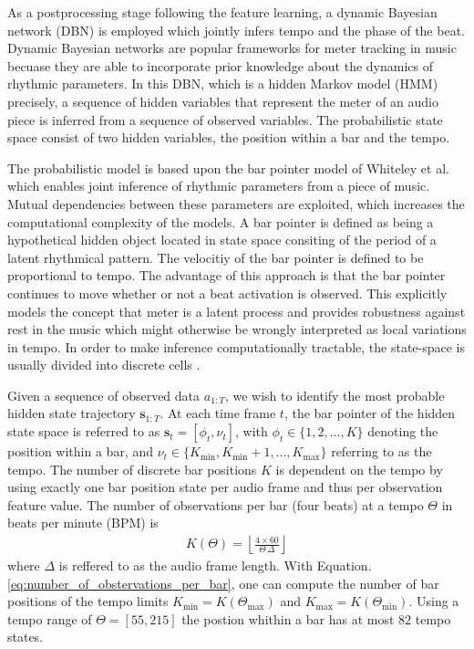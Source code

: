 \documentclass{scrartcl}
\begin{document}
As a postprocessing stage following the feature learning, a dynamic Bayesian network (DBN) is employed which jointly infers tempo and the phase of the beat. Dynamic Bayesian networks are popular frameworks for meter tracking in music becuase they are able to incorporate prior knowledge about the dynamics of rhythmic parameters. 
In this DBN, which is a hidden Markov model (HMM) precisely, a sequence of hidden variables that represent the meter of an audio piece is inferred from a sequence of observed variables. The probabilistic state space consist of two hidden variables, the position within a bar and the tempo. 

The probabilistic model is based upon the bar pointer model of Whiteley et al. \cite{Whiteley2006} which enables joint inference of rhythmic parameters from a piece of music. Mutual dependencies between these parameters are exploited, which increases the computational complexity of the models. A bar pointer is defined as being a hypothetical hidden object located in state space consiting of the period of a latent rhythmical pattern. The velocitiy of the bar pointer is defined to be proportional to tempo. The advantage of this approach is that the bar pointer continues to move whether or not a beat activation is observed. This explicitly models the concept that meter is a latent process and provides robustness against rest in the music which might otherwise be wrongly interpreted as local variations in tempo. In order to make inference computationally tractable, the state-space is usually divided into discrete cells \cite{Krebs2015}. 

Given a sequence of observed data $a_{1:T}$, we wish to identify the most probable hidden state trajectory $\mathbf s_{1:T}$. At each time frame $t$, the bar pointer of the hidden state space is referred to as $\mathbf s_t = [\phi_t, \nu_t]$, with $\phi_t \in \{1, 2, \dots, K\}$ denoting the position within a bar, and $\nu_t \in \{ K_{\text{min}}, K_{\text{min}}+1, \dots, K_{\text{max}}\}$ referring to as the tempo. The number of discrete bar positions $K$ is dependent on the tempo by using exactly one bar position state per audio frame and thus per observation feature value. The number of observations per bar (four beats) at a tempo $\Theta$ in beats per minute (BPM) is
\begin{align}
K(\Theta) = \left\lfloor \frac{4 \times 60}{\Theta \, \Delta} \right\rfloor 
\label{eq:number_of_obstervations_per_bar}
\end{align} 
where $\Delta$ is reffered to as the audio frame length. With Equation. \ref{eq:number_of_obstervations_per_bar}, one can compute the number of bar positions of the tempo limits $K_\text{min} = K(\Theta_\text{max})$ and $K_\text{max} =K(\Theta_\text{min})$. Using a tempo range of  $\Theta = [55, 215]$ the postion whithin a bar has at most $82$ tempo states.
\end{document}
